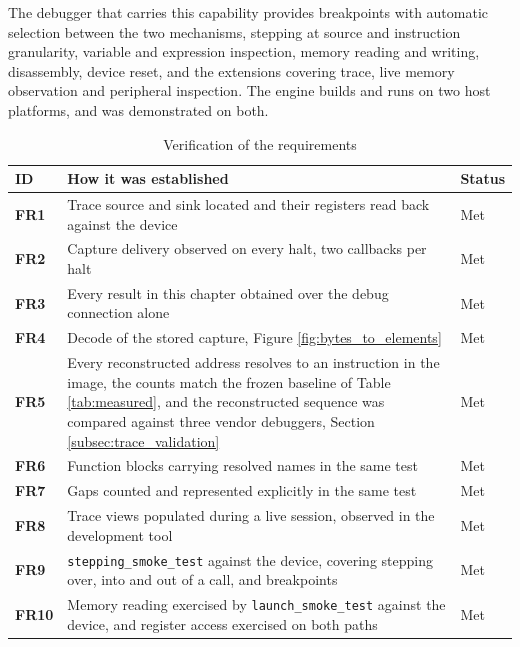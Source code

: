 The debugger that carries this capability provides breakpoints with automatic selection between the two mechanisms, stepping at source and instruction granularity, variable and expression inspection, memory reading and writing, disassembly, device reset, and the extensions covering trace, live memory observation and peripheral inspection. The engine builds and runs on two host platforms, and was demonstrated on both.

\begin{table}[htbp]
    \centering
    \caption{Verification of the requirements}
    \label{tab:verification}
    \begin{tabularx}{\linewidth}{| @{}>{\hsize\bfseries}Y | >{\hsize}Y | >{\hsize}Y@{} |}
        \hline
        ID & \textbf{How it was established} & \textbf{Status} \\
        \hline
        FR1 & Trace source and sink located and their registers read back against the device & Met \\
        \hline
        FR2 & Capture delivery observed on every halt, two callbacks per halt & Met \\
        \hline
        FR3 & Every result in this chapter obtained over the debug connection alone & Met \\
        \hline
        FR4 & Decode of the stored capture, Figure \ref{fig:bytes_to_elements} & Met \\
        \hline
        FR5 & Every reconstructed address resolves to an instruction in the image, the counts match the frozen baseline of Table \ref{tab:measured}, and the reconstructed sequence was compared against three vendor debuggers, Section \ref{subsec:trace_validation} & Met \\
        \hline
        FR6 & Function blocks carrying resolved names in the same test & Met \\
        \hline
        FR7 & Gaps counted and represented explicitly in the same test & Met \\
        \hline
        FR8 & Trace views populated during a live session, observed in the development tool & Met \\
        \hline
        FR9 & \texttt{\scriptsize stepping\_smoke\_test} against the device, covering stepping over, into and out of a call, and breakpoints & Met \\
        \hline
        FR10 & Memory reading exercised by \texttt{\scriptsize launch\_smoke\_test} against the device, and register access exercised on both paths & Met \\

\end{tabularx}
\end{table}
